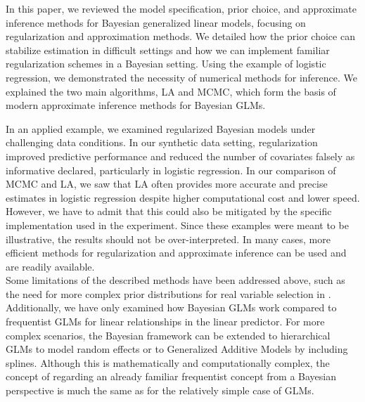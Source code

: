 In this paper, we reviewed the model specification, prior choice, and approximate inference methods for Bayesian generalized linear models, focusing on regularization and approximation methods.
We detailed how the prior choice can stabilize estimation in difficult settings and how we can implement familiar regularization schemes in a Bayesian setting.
Using the example of logistic regression, we demonstrated the necessity of numerical methods for inference. We explained the two main algorithms, LA and MCMC, which form the basis of modern approximate inference methods for Bayesian GLMs.

In an applied example, we examined regularized Bayesian models under challenging data conditions.
In our synthetic data setting, regularization improved predictive performance and reduced the number of covariates falsely as informative declared, particularly in logistic regression.
In our comparison of MCMC and LA, we saw that LA often provides more accurate and precise estimates in logistic regression despite higher computational cost and lower speed. However, we have to admit that this could also be mitigated by the specific implementation used in the experiment.
Since these examples were meant to be illustrative, the results should not be over-interpreted.
In many cases, more efficient methods for regularization and approximate inference can be used and are readily available.\\

Some limitations of the described methods have been addressed above, such as the need for more complex prior distributions for real variable selection in .
Additionally, we have only examined how Bayesian GLMs work compared to frequentist GLMs for linear relationships in the linear predictor.
For more complex scenarios, the Bayesian framework can be extended to hierarchical GLMs to model random effects or to Generalized Additive Models by including splines.
Although this is mathematically and computationally complex, the concept of regarding an already familiar frequentist concept from a Bayesian perspective is much the same as for the relatively simple case of GLMs.
